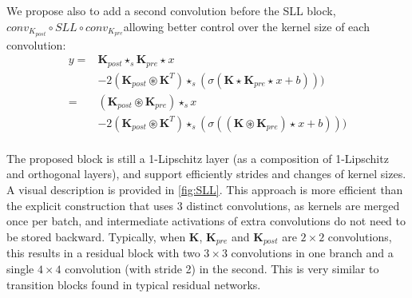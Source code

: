 \documentclass[10pt]{article}
\theoremstyle{plain}
\theoremstyle{definition}
\theoremstyle{remark}
\newcommand{\mathbconv}{\circledast} %
\newcommand{\kernel}[1]{\mathbf{#1}}
\newcommand{\convker}[1]{\star_{#1}}
\begin{document}
    We propose also to add a second convolution before the SLL block, $conv_{K_{post}}\circ SLL\circ conv_{K_{pre}}$allowing better control over the kernel size of each convolution:
    \begin{align*}
        y = &\kernel{K}_{post} \convker{s} \kernel{K}_{pre} \convker{} x \\
        & - 2(\kernel{K}_{post} \mathbconv \kernel{K}^T) \convker{s} ( \sigma ( \kernel{K} \convker{} \kernel{K}_{pre} \convker{} x + b ))) \\
        = &(\kernel{K}_{post} \mathbconv \kernel{K}_{pre}) \convker{s} x \\
        & - 2(\kernel{K}_{post} \mathbconv \kernel{K}^T) \convker{s} ( \sigma ( (\kernel{K} \mathbconv \kernel{K}_{pre}) \convker{} x + b ))) \\
    \end{align*}
    
    The proposed block is still a 1-Lipschitz layer (as a composition of 1-Lipschitz and orthogonal layers), and support efficiently strides and changes of kernel sizes.
    A visual description is provided in \cref{fig:SLL}. This approach is more efficient than the explicit construction that uses 3 distinct convolutions, as kernels are merged once per batch, and intermediate activations of extra convolutions do not need to be stored backward. Typically, when $\kernel{K}$, $\kernel{K}_{pre}$ and $\kernel{K}_{post}$ are $2 \times 2$ convolutions, this results in a residual block with two $3 \times 3$ convolutions in one branch and a single $4 \times 4$ convolution (with stride 2) in the second. This is very similar to transition blocks found in typical residual networks.
\end{document}
